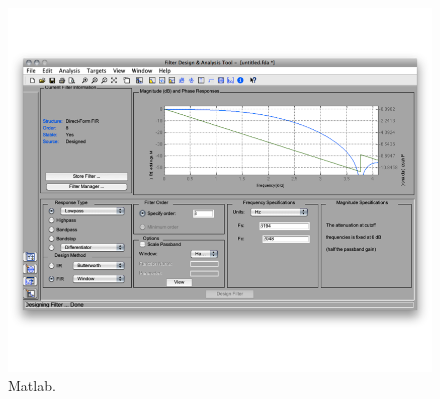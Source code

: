 \begin{figure}[ht]
	\centering
	\includegraphics[scale=1]{images/matlab}
	\caption{Matlab.}
	\label{fig:matlab}
\end{figure}

